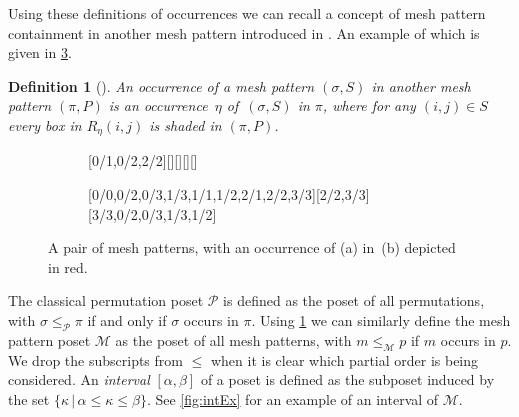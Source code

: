 \documentclass[preprint,11pt]{elsarticle}
\newtheorem{defn}[thm]{Definition}\crefname{defn}{Definition}{Definitions}
\numberwithin{equation}{section}
\numberwithin{figure}{section}
\numberwithin{thm}{section}
\begin{document}
Using these definitions of occurrences we can recall a concept of mesh
pattern containment in another mesh pattern introduced in \cite{TU17}.
An example of which is given in \cref{fig:occEx}.

\begin{defn}[\cite{TU17}]\label{defn:meshOcc}
An occurrence of a mesh pattern $(\sigma,S)$ in another mesh
pattern $(\pi,P)$ is an occurrence~$\eta$ of~$(\sigma,S)$ in $\pi$, where for any $(i,j)\in S$
every box in $R_\eta(i,j)$ is shaded in $(\pi,P)$.
\end{defn}

\begin{figure}\centering
\begin{subfigure}[b]{0.3\textwidth}
\centering{}[0/1,0/2,2/2][][][][]
\caption{}\label{subfiga}\end{subfigure}
\begin{subfigure}[b]{0.3\textwidth}\centering
{}[0/0,0/2,0/3,1/3,1/1,1/2,2/1,2/2,3/3][2/2,3/3][3/3,0/2,0/3,1/3,1/2]
\caption{}\label{subfigc}\end{subfigure}
\caption{A pair of mesh patterns, with an occurrence of (a) in~(b) depicted in red.
 }\label{fig:occEx}
\end{figure}

The classical permutation poset $\mathcal{P}$ is defined as the poset of all permutations,
with $\sigma\le_\mathcal{P}\pi$ if and only if $\sigma$ occurs in $\pi$. Using \cref{defn:meshOcc}
we can similarly define the mesh pattern poset $\mathcal{M}$ as the poset of all mesh patterns,
with $m\le_\mathcal{M} p$ if $m$ occurs in $p$. We drop the subscripts from $\le$ when it is clear
which partial order is being considered. An \emph{interval} $[\alpha,\beta]$ of a poset is defined as the subposet induced by the set
$\{\kappa\,|\,\alpha\le\kappa\le\beta\}$. See \cref{fig:intEx} for an example of an interval of $\mathcal{M}$.
\end{document}
